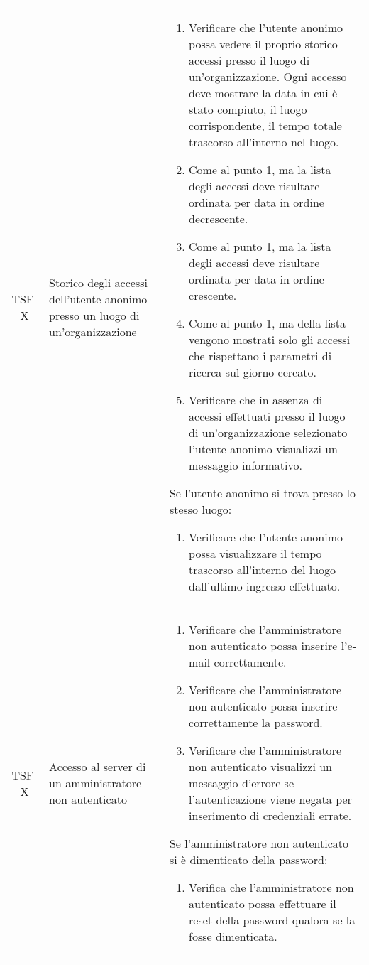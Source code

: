 {\begin{longtable}{ c | C{3cm} | C{11cm} }
TSF-X & Storico degli accessi dell'utente anonimo presso un luogo di un'organizzazione & \begin{enumerate}
    \item Verificare che l'utente anonimo possa vedere il proprio storico accessi presso il luogo di un'organizzazione. Ogni accesso deve mostrare la data in cui è stato compiuto, il luogo corrispondente, il tempo totale trascorso all'interno nel luogo.
    \item Come al punto 1, ma la lista degli accessi deve risultare ordinata per data in ordine decrescente.
    \item Come al punto 1, ma la lista degli accessi deve risultare ordinata per data in ordine crescente.
    \item Come al punto 1, ma della lista vengono mostrati solo gli accessi che rispettano i parametri di ricerca sul giorno cercato.
    \item Verificare che in assenza di accessi effettuati presso il luogo di un'organizzazione selezionato l'utente anonimo visualizzi un messaggio informativo.
\end{enumerate}
Se l'utente anonimo si trova presso lo stesso luogo:
\begin{enumerate}
    \item Verificare che l'utente anonimo possa visualizzare il tempo trascorso all'interno del luogo dall'ultimo ingresso effettuato.
\end{enumerate} \\

TSF-X & Accesso al server di un amministratore non autenticato & \begin{enumerate}
    \item Verificare che l'amministratore non autenticato possa inserire l'e-mail correttamente.
    \item Verificare che l'amministratore non autenticato possa inserire correttamente la password.
    \item Verificare che l'amministratore non autenticato visualizzi un messaggio d'errore se l'autenticazione viene negata per inserimento di credenziali errate.
\end{enumerate}
Se l'amministratore non autenticato si è dimenticato della password:
\begin{enumerate}
    \item Verifica che l'amministratore non autenticato possa effettuare il reset della password qualora se la fosse dimenticata.
\end{enumerate} \\


\end{longtable}}
